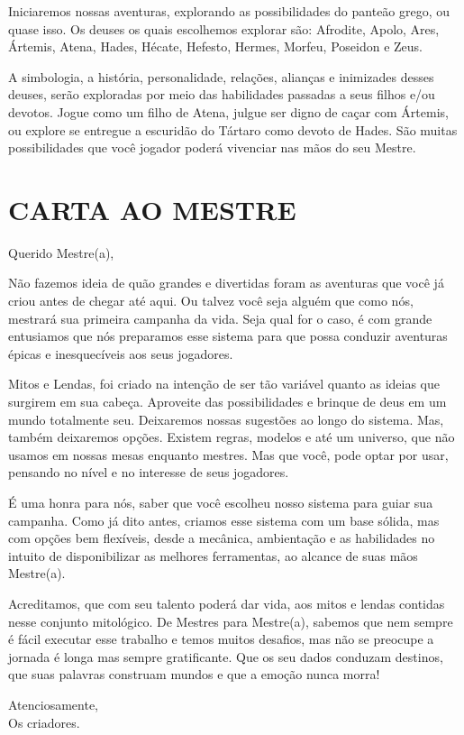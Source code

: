 \begin{Introducao}
    Iniciaremos nossas aventuras, explorando as possibilidades do panteão grego, ou quase isso. Os deuses os quais escolhemos explorar são: Afrodite, Apolo, Ares, Ártemis, Atena, Hades, Hécate, Hefesto, Hermes, Morfeu, Poseidon e Zeus.

    A simbologia, a história, personalidade, relações, alianças e inimizades desses deuses, serão exploradas por meio das habilidades passadas a seus filhos e/ou devotos. Jogue como um filho de Atena, julgue ser digno de caçar com Ártemis, ou explore se entregue a escuridão do Tártaro como devoto de Hades. São muitas possibilidades que você jogador poderá vivenciar nas mãos do seu Mestre.

\section{CARTA AO MESTRE}
Querido Mestre(a),

Não fazemos ideia de quão grandes e divertidas foram as aventuras que você já criou antes de chegar até aqui. Ou talvez você seja alguém que como nós, mestrará sua primeira campanha da vida. Seja qual for o caso, é com grande entusiamos que nós preparamos esse sistema para que possa conduzir aventuras épicas e inesquecíveis aos seus jogadores.

Mitos e Lendas, foi criado na intenção de ser tão variável quanto as ideias que surgirem em sua cabeça. Aproveite das possibilidades e brinque de deus em um mundo totalmente seu. Deixaremos nossas sugestões ao longo do sistema. Mas, também deixaremos opções. Existem regras, modelos e até um universo, que não usamos em nossas mesas enquanto mestres. Mas que você, pode optar por usar, pensando no nível e no interesse de seus jogadores.

É uma honra para nós, saber que você escolheu nosso sistema para guiar sua campanha. Como já dito antes, criamos esse sistema com um base sólida, mas com opções bem flexíveis, desde a mecânica, ambientação e as habilidades no intuito de disponibilizar as melhores ferramentas, ao alcance de suas mãos Mestre(a).

Acreditamos, que com seu talento poderá dar vida, aos mitos e lendas contidas nesse conjunto mitológico. De Mestres para Mestre(a), sabemos que nem sempre é fácil executar esse trabalho e temos muitos desafios, mas não se preocupe a jornada é longa mas sempre gratificante. Que os seu dados conduzam destinos, que suas palavras construam mundos e que a emoção nunca morra!

\begin{flushright}
Atenciosamente, \\ Os criadores.
\end{flushright}


\end{Introducao}
